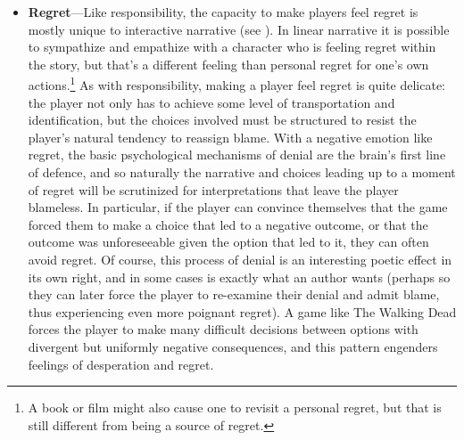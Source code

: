 \begin{itemize}
  \item \textbf{Regret}---Like responsibility, the capacity to make players feel regret is mostly unique to interactive narrative (see \citep{Frome2006,Zagal2009}).
%
    In linear narrative it is possible to sympathize and empathize with a character who is feeling regret within the story, but that's a different feeling than personal regret for one's own actions.\footnote{A book or film might also cause one to revisit a personal regret, but that is still different from being a source of regret.}
%
As with responsibility, making a player feel regret is quite delicate: the player not only has to achieve some level of transportation and identification, but the choices involved must be structured to resist the player's natural tendency to reassign blame.
%
With a negative emotion like regret, the basic psychological mechanisms of denial are the brain's first line of defence, and so naturally the narrative and choices leading up to a moment of regret will be scrutinized for interpretations that leave the player blameless.
%
In particular, if the player can convince themselves that the game forced them to make a choice that led to a negative outcome, or that the outcome was unforeseeable given the option that led to it, they can often avoid regret.
%
Of course, this process of denial is an interesting poetic effect in its own right, and in some cases is exactly what an author wants (perhaps so they can later force the player to re-examine their denial and admit blame, thus experiencing even more poignant regret).
%
A game like The Walking Dead \citep{TheWalkingDead} forces the player to make many difficult decisions between options with divergent but uniformly negative consequences, and this pattern engenders feelings of desperation and regret.

\end{itemize}



